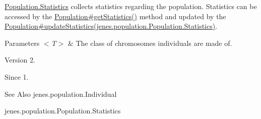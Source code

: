 \hyperlink{}{Population.\-Statistics} collects statistics regarding the population. Statistics can be accessed by the \hyperlink{}{Population\#get\-Statistics()} method and updated by the \hyperlink{}{Population\#update\-Statistics(jenes.\-population.\-Population.\-Statistics)}.


\begin{DoxyParams}{Parameters}
{\em $<$\-T$>$} & The class of chromosomes individuals are made of.\\
\hline
\end{DoxyParams}
\begin{DoxyVersion}{Version}
2. 
\end{DoxyVersion}
\begin{DoxySince}{Since}
1.
\end{DoxySince}
\begin{DoxySeeAlso}{See Also}
jenes.\-population.\-Individual 

jenes.\-population.\-Population.\-Statistics 
\end{DoxySeeAlso}


